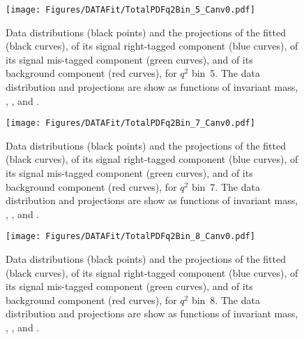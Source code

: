 \begin{figure}[!hbtp]
  \centering
  \texttt{[image: Figures/DATAFit/TotalPDFq2Bin\_5\_Canv0.pdf]}
  \caption{Data distributions (black points) and the projections of the fitted \pdf (black curves), of its signal right-tagged component (blue curves), of its signal mis-tagged component (green curves), and of its background component (red curves), for $q^2$ bin~5.
    The data distribution and \pdf projections are show as functions of \PBz invariant mass, \cTL, \cTK, and \PHI.}
  \label{fig:res_bin5}
\end{figure}

\begin{figure}
  \centering
  \texttt{[image: Figures/DATAFit/TotalPDFq2Bin\_7\_Canv0.pdf]}
  \caption{Data distributions (black points) and the projections of the fitted \pdf (black curves), of its signal right-tagged component (blue curves), of its signal mis-tagged component (green curves), and of its background component (red curves), for $q^2$ bin~7.
    The data distribution and \pdf projections are show as functions of \PBz invariant mass, \cTL, \cTK, and \PHI.}
  \label{fig:res_bin7}
\end{figure}

\begin{figure}
  \centering
  \texttt{[image: Figures/DATAFit/TotalPDFq2Bin\_8\_Canv0.pdf]}
  \caption{Data distributions (black points) and the projections of the fitted \pdf (black curves), of its signal right-tagged component (blue curves), of its signal mis-tagged component (green curves), and of its background component (red curves), for $q^2$ bin~8.
    The data distribution and \pdf projections are show as functions of \PBz invariant mass, \cTL, \cTK, and \PHI.}
  \label{fig:res_bin8}
\end{figure}
